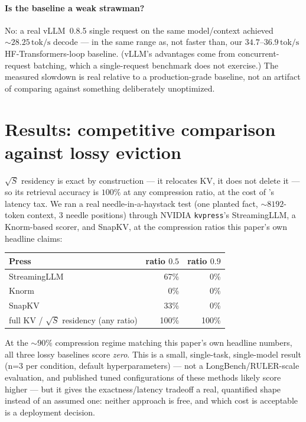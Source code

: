 \documentclass[11pt]{article}
\begin{document}
\paragraph{Is the baseline a weak strawman?} No: a real vLLM~0.8.5 single
request on the same model/context achieved $\sim\!28.25\,\mathrm{tok/s}$
decode --- in the same range as, not faster than, our
$34.7$--$36.9\,\mathrm{tok/s}$ HF-Transformers-loop baseline. (vLLM's
advantages come from concurrent-request batching, which a single-request
benchmark does not exercise.) The measured slowdown is real relative to a
production-grade baseline, not an artifact of comparing against something
deliberately unoptimized.

\section{Results: competitive comparison against lossy eviction}

$\sqrt{S}$ residency is exact by construction --- it relocates KV, it does
not delete it --- so its retrieval accuracy is $100\%$ at any compression
ratio, at the cost of 's latency tax. We ran a real
needle-in-a-haystack test (one planted fact, $\sim\!8192$-token context, 3
needle positions) through NVIDIA \texttt{kvpress}'s StreamingLLM, a
Knorm-based scorer, and SnapKV, at the compression ratios this paper's own
headline claims:

\begin{center}
\begin{tabular}{@{}lrr@{}}
\toprule
Press & ratio $0.5$ & ratio $0.9$ \\
\midrule
StreamingLLM~\cite{xiao2023streamingllm} & 67\% & 0\% \\
Knorm & 0\% & 0\% \\
SnapKV~\cite{li2024snapkv} & 33\% & 0\% \\
\midrule
full KV / $\sqrt{S}$ residency (any ratio) & 100\% & 100\% \\
\bottomrule
\end{tabular}
\end{center}
At the $\sim\!90\%$ compression regime matching this paper's own headline
numbers, all three lossy baselines score \emph{zero}. This is a small,
single-task, single-model result (n=3 per condition, default
hyperparameters) --- not a LongBench/RULER-scale evaluation, and published
tuned configurations of these methods likely score higher --- but it gives
the exactness/latency tradeoff a real, quantified shape instead of an
assumed one: neither approach is free, and which cost is acceptable is a
deployment decision.
\end{document}
